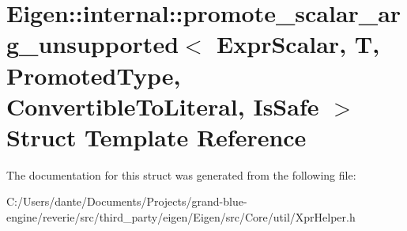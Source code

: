 \hypertarget{struct_eigen_1_1internal_1_1promote__scalar__arg__unsupported}{}\section{Eigen\+::internal\+::promote\+\_\+scalar\+\_\+arg\+\_\+unsupported$<$ Expr\+Scalar, T, Promoted\+Type, Convertible\+To\+Literal, Is\+Safe $>$ Struct Template Reference}
\label{struct_eigen_1_1internal_1_1promote__scalar__arg__unsupported}


The documentation for this struct was generated from the following file\+:\begin{DoxyCompactItemize}
\item 
C\+:/\+Users/dante/\+Documents/\+Projects/grand-\/blue-\/engine/reverie/src/third\+\_\+party/eigen/\+Eigen/src/\+Core/util/Xpr\+Helper.\+h\end{DoxyCompactItemize}
